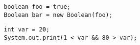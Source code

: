 \documentclass[en, 11pt, xcolor=dvipsnames]{beamer}
\begin{document}
\begin{frame}[fragile]


	\begin{columns}[c]
		\begin{column}{0.9\textwidth}

			\begin{lstlisting}[style=Java]
boolean foo = true;
Boolean bar = new Boolean(foo);\end{lstlisting}

			\begin{lstlisting}[style=Java]
int var = 20;
System.out.print(1 < var && 80 > var);\end{lstlisting}

		\end{column}
	\end{columns}

\end{frame}
\end{document}
